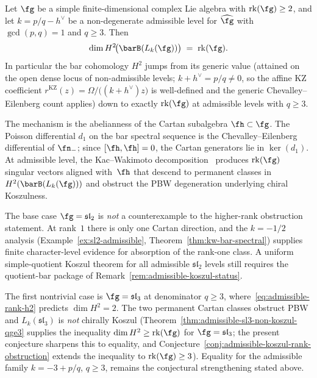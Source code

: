 \begin{conjecture}
\label{conj:admissible-rank-obstruction}%
\ClaimStatusConjectured
{}%
%
Let $\fg$ be a simple finite-dimensional complex Lie algebra with
$\mathrm{rk}(\fg) \geq 2$, and let $k = p/q - h^\vee$ be a
non-degenerate admissible level for $\widehat{\fg}$ with
$\gcd(p,q) = 1$ and $q \geq 3$. Then
\begin{equation}\label{eq:admissible-rank-h2}
\dim H^2\!\bigl(\barB(L_k(\fg))\bigr) \;=\; \mathrm{rk}(\fg).
\end{equation}
In particular the bar cohomology $H^2$ jumps from its generic value
\textup{(}attained on the open dense locus of non-admissible levels;
$k + h^\vee = p/q \neq 0$, so the affine KZ coefficient
$r^{\mathrm{KZ}}(z)=\Omega/\bigl((k{+}h^\vee)z\bigr)$ is well-defined
and the generic Chevalley--Eilenberg count applies\textup{)} down to
exactly
$\mathrm{rk}(\fg)$ at admissible levels with $q \geq 3$.
\end{conjecture}

\begin{remark}
\label{rem:admissible-rank-obstruction-mechanism}
The mechanism is the abelianness of the Cartan subalgebra
$\fh \subset \fg$. The Poisson differential $d_1$ on the bar
spectral sequence is the Chevalley--Eilenberg differential of
$\fn_-$; since $[\fh, \fh] = 0$, the Cartan generators lie in
$\ker(d_1)$. At admissible level, the Kac--Wakimoto
decomposition~\cite{KW88} produces $\mathrm{rk}(\fg)$ singular
vectors aligned with~$\fh$ that descend to permanent classes in
$H^2(\barB(L_k(\fg)))$ and obstruct the PBW degeneration
underlying chiral Koszulness.

The base case $\fg = \mathfrak{sl}_2$ is \emph{not} a
counterexample to the higher-rank obstruction statement. At rank~$1$
there is only one Cartan direction, and the $k = -1/2$ analysis
\textup{(}Example~\ref{ex:sl2-admissible},
Theorem~\ref{thm:kw-bar-spectral}\textup{)} supplies finite
character-level evidence for absorption of the rank-one class. A
uniform simple-quotient Koszul theorem for all admissible
$\mathfrak{sl}_2$ levels still requires the quotient-bar package of
Remark~\ref{rem:admissible-koszul-status}.

The first nontrivial case is $\fg = \mathfrak{sl}_3$ at
denominator $q \geq 3$, where~\eqref{eq:admissible-rank-h2}
predicts $\dim H^2 = 2$. The two permanent Cartan classes
obstruct PBW and
$L_k(\mathfrak{sl}_3)$ is \emph{not} chirally Koszul
\textup{(}Theorem~\ref{thm:admissible-sl3-non-koszul-qge3}
supplies the inequality
$\dim H^2 \geq \mathrm{rk}(\fg)$ for $\fg = \mathfrak{sl}_3$;
the present conjecture sharpens this to equality, and
Conjecture~\ref{conj:admissible-koszul-rank-obstruction} extends
the inequality to $\mathrm{rk}(\fg) \geq 3$\textup{)}.  Equality for
the admissible family $k=-3+p/q$, $q\geq3$, remains the conjectural
strengthening stated above.
\end{remark}


